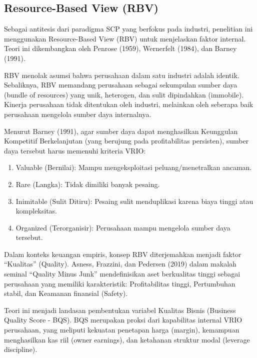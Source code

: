 \documentclass[12pt,a4paper]{report}
\providecommand{\tightlist}{%
  \setlength{\itemsep}{0pt}\setlength{\parskip}{0pt}%
}
\begin{document}
\hypertarget{resource-based-view-rbv}{%
\subsection{Resource-Based View (RBV)}\label{resource-based-view-rbv}}

Sebagai antitesis dari paradigma SCP yang berfokus pada industri,
penelitian ini menggunakan Resource-Based View (RBV) untuk menjelaskan
faktor internal. Teori ini dikembangkan oleh Penrose (1959), Wernerfelt
(1984), dan Barney (1991).

RBV menolak asumsi bahwa perusahaan dalam satu industri adalah identik.
Sebaliknya, RBV memandang perusahaan sebagai sekumpulan sumber daya
(bundle of resources) yang unik, heterogen, dan sulit dipindahkan
(immobile). Kinerja perusahaan tidak ditentukan oleh industri, melainkan
oleh seberapa baik perusahaan mengelola sumber daya internalnya.

Menurut Barney (1991), agar sumber daya dapat menghasilkan Keunggulan
Kompetitif Berkelanjutan (yang berujung pada profitabilitas persisten),
sumber daya tersebut harus memenuhi kriteria VRIO:

\begin{enumerate}
\def\labelenumi{\arabic{enumi}.}
\tightlist
\item
  Valuable (Bernilai): Mampu mengeksploitasi peluang/menetralkan
  ancaman.
\item
  Rare (Langka): Tidak dimiliki banyak pesaing.
\item
  Inimitable (Sulit Ditiru): Pesaing sulit menduplikasi karena biaya
  tinggi atau kompleksitas.
\item
  Organized (Terorganisir): Perusahaan mampu mengelola sumber daya
  tersebut.
\end{enumerate}

Dalam konteks keuangan empiris, konsep RBV diterjemahkan menjadi faktor
``Kualitas'' (Quality). Asness, Frazzini, dan Pedersen (2019) dalam
makalah seminal ``Quality Minus Junk'' mendefinisikan aset berkualitas
tinggi sebagai perusahaan yang memiliki karakteristik: Profitabilitas
tinggi, Pertumbuhan stabil, dan Keamanan finansial (Safety).

Teori ini menjadi landasan pembentukan variabel Kualitas Bisnis
(Business Quality Score - BQS). BQS merupakan proksi dari kapabilitas
internal VRIO perusahaan, yang meliputi kekuatan penetapan harga
(margin), kemampuan menghasilkan kas riil (owner earnings), dan
ketahanan struktur modal (leverage discipline).
\end{document}
